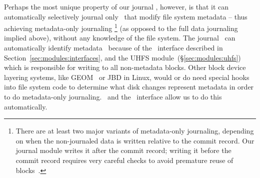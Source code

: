 Perhaps the most unique property of our journal \module, however, is that it can
automatically selectively journal only \chdescs\ that modify file system
metadata -- thus achieving metadata-only journaling \footnote{There are at least
two major variants of metadata-only journaling, depending on when the
non-journaled data is written relative to the commit record. Our journal module
writes it after the commit record; writing it before the commit record requires
very careful checks to avoid premature reuse of blocks~\cite{tweedie00ext3}.}
(as opposed to the full data journaling implied above), without any knowledge of
the file system.
%
The journal \module\ can automatically identify metadata \chdescs\ because of
the \LFS\ interface described in Section~\ref{sec:modules:interfaces}, and the
UHFS module~(\S\ref{sec:modules:uhfs}) which is responsible for writing to all
non-metadata blocks. Other block device layering systems, like GEOM~\cite{geom}
or JBD in Linux, would or do need special hooks into file system code to
determine what disk changes represent metadata in order to do metadata-only
journaling. \Chdescs\ and the \LFS\ interface allow us to do this automatically.
